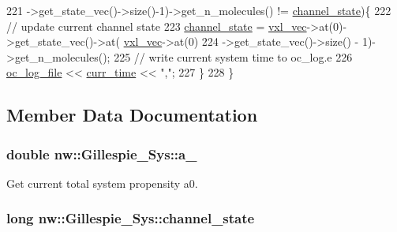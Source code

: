 \begin{DoxyCode}
221         ->get\_state\_vec()->size()-1)->get\_n\_molecules() != \hyperlink{classnw_1_1_gillespie___sys_a2e7300d68c9faccf444866e67842133f}{channel\_state})\{
222 \textcolor{comment}{//      update current channel state}
223         \hyperlink{classnw_1_1_gillespie___sys_a2e7300d68c9faccf444866e67842133f}{channel\_state} = \hyperlink{classnw_1_1_gillespie___sys_acf4d19490ed7a8447296d7c206ef0590}{vxl\_vec}->at(0)->get\_state\_vec()->at(
      \hyperlink{classnw_1_1_gillespie___sys_acf4d19490ed7a8447296d7c206ef0590}{vxl\_vec}->at(0)
224                         ->get\_state\_vec()->size() - 1)->get\_n\_molecules();
225 \textcolor{comment}{//      write current system time to oc\_log.e}
226         \hyperlink{classnw_1_1_gillespie___sys_a4209e0d87ac2e0c5b9cad1074a900c80}{oc\_log\_file} << \hyperlink{classnw_1_1_gillespie___sys_ac83bb4eaee1f8b46610a8243a83fb3ad}{curr\_time} << \textcolor{stringliteral}{","};
227     \}
228 \}
\end{DoxyCode}


\subsection{Member Data Documentation}
\hypertarget{classnw_1_1_gillespie___sys_a72cfc8f0044d7f2130f834aba5e22e18}{
\subsubsection[{a\+\_\+0}]{\setlength{\rightskip}{0pt plus 5cm}double nw\+::\+Gillespie\+\_\+\+Sys\+::a\+\_\hspace{0.3cm}{\ttfamily [private]}}}\label{classnw_1_1_gillespie___sys_a72cfc8f0044d7f2130f834aba5e22e18}


Get current total system propensity a0. 

\hypertarget{classnw_1_1_gillespie___sys_a2e7300d68c9faccf444866e67842133f}{
\subsubsection[{channel\+\_\+state}]{\setlength{\rightskip}{0pt plus 5cm}long nw\+::\+Gillespie\+\_\+\+Sys\+::channel\+\_\+state\hspace{0.3cm}{\ttfamily [private]}}}\label{classnw_1_1_gillespie___sys_a2e7300d68c9faccf444866e67842133f}


